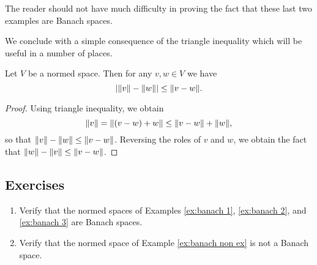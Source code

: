 The reader should not have much difficulty in proving the fact that these last two examples are Banach spaces.

We conclude with a simple consequence of the triangle inequality which will be useful in a number of places.

\begin{proposition}
Let $V$ be a normed space. Then for any $v,w\in V$ we have \[|\norm{v}-\norm{w}|\leq\norm{v-w}.\]
\end{proposition}

\begin{proof}
Using triangle inequality, we obtain \[\norm{v}=\norm{(v-w)+w}\leq\norm{v-w}+\norm{w},\] so that $\norm{v}-\norm{w}\leq\norm{v-w}$. Reversing the roles of $v$ and $w$, we obtain the fact that $\norm{w}-\norm{v}\leq\norm{v-w}$.
\end{proof}

\subsection*{Exercises}
\begin{enumerate}[label=\arabic*)]
    \item Verify that the normed spaces of Examples \ref{ex:banach 1}, \ref{ex:banach 2}, and \ref{ex:banach 3} are Banach spaces.
    \item Verify that the normed space of Example \ref{ex:banach non ex} is not a Banach space.
\end{enumerate}
